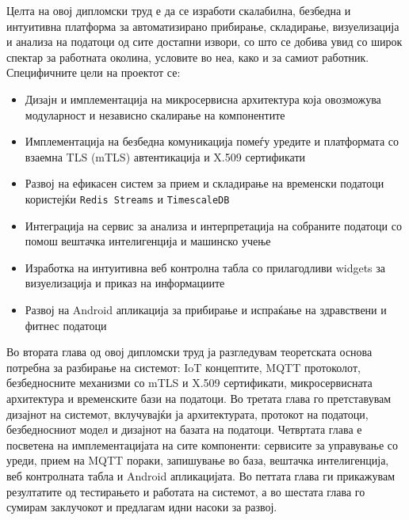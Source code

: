 Целта на овој дипломски труд е да се изработи скалабилна, безбедна и
интуитивна платформа за автоматизирано прибирање, складирање,
визуелизација и анализа на податоци од сите достапни извори, со што се
добива увид со широк спектар за работната околина, условите во неа, како
и за самиот работник. Специфичните цели на проектот се:

\begin{itemize}
\item
  Дизајн и имплементација на микросервисна архитектура која овозможува
  модуларност и независно скалирање на компонентите
\item
  Имплементација на безбедна комуникација помеѓу уредите и платформата
  со взаемна TLS (mTLS) автентикација и X.509 сертификати
\item
  Развој на ефикасен систем за прием и складирање на временски податоци
  користејќи \texttt{Redis Streams} и \texttt{TimescaleDB}
\item
  Интеграција на сервис за анализа и интерпретација на собраните
  податоци со помош вештачка интелигенција и машинско учење
\item
  Изработка на интуитивна веб контролна табла со прилагодливи widgets за
  визуелизација и приказ на информациите
\item
  Развој на Android апликација за прибирање и испраќање на здравствени и
  фитнес податоци
\end{itemize}

Во втората глава од овој дипломски труд ја разгледувам теоретската
основа потребна за разбирање на системот: IoT концептите, MQTT
протоколот, безбедносните механизми со mTLS и X.509 сертификати,
микросервисната архитектура и временските бази на податоци. Во третата
глава го претставувам дизајнот на системот, вклучувајќи ја
архитектурата, протокот на податоци, безбедносниот модел и дизајнот на
базата на податоци. Четвртата глава е посветена на имплементацијата на
сите компоненти: сервисите за управување со уреди, прием на MQTT пораки,
запишување во база, вештачка интелигенција, веб контролната табла и
Android апликацијата. Во петтата глава ги прикажувам резултатите од
тестирањето и работата на системот, а во шестата глава го сумирам
заклучокот и предлагам идни насоки за развој.
